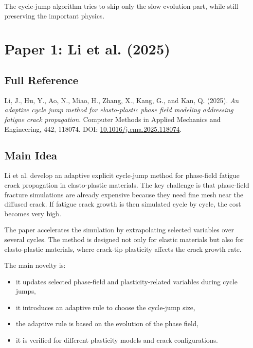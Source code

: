 \documentclass[11pt,a4paper]{article}
\begin{document}
The cycle-jump algorithm tries to skip only the slow evolution part, while still preserving the important physics.

\section{Paper 1: Li et al. (2025)}

\subsection{Full Reference}

Li, J., Hu, Y., Ao, N., Miao, H., Zhang, X., Kang, G., and Kan, Q. (2025). \textit{An adaptive cycle jump method for elasto-plastic phase field modeling addressing fatigue crack propagation}. Computer Methods in Applied Mechanics and Engineering, 442, 118074. DOI: \href{https://doi.org/10.1016/j.cma.2025.118074}{10.1016/j.cma.2025.118074}.

\subsection{Main Idea}

Li et al. develop an adaptive explicit cycle-jump method for phase-field fatigue crack propagation in elasto-plastic materials. The key challenge is that phase-field fracture simulations are already expensive because they need fine mesh near the diffused crack. If fatigue crack growth is then simulated cycle by cycle, the cost becomes very high.

The paper accelerates the simulation by extrapolating selected variables over several cycles. The method is designed not only for elastic materials but also for elasto-plastic materials, where crack-tip plasticity affects the crack growth rate.

The main novelty is:

\begin{itemize}
    \item it updates selected phase-field and plasticity-related variables during cycle jumps,
    \item it introduces an adaptive rule to choose the cycle-jump size,
    \item the adaptive rule is based on the evolution of the phase field,
    \item it is verified for different plasticity models and crack configurations.
\end{itemize}
\end{document}
